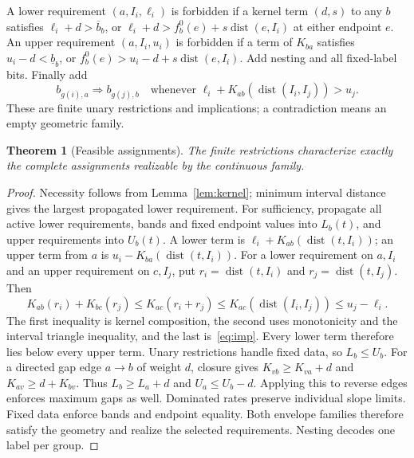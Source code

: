 \documentclass[10pt,letterpaper]{article}
\newtheorem{theorem}[proposition]{Theorem}
\newcommand{\dist}{\operatorname{dist}}
\begin{document}
A lower requirement $(a,I_i,\ell_i)$ is forbidden if a kernel term $(d,s)$ to any $b$ satisfies $\ell_i+d>\overline b_b$, or $\ell_i+d>f_b^0(e)+s\dist(e,I_i)$ at either endpoint $e$. An upper requirement $(a,I_i,u_i)$ is forbidden if a term of $K_{ba}$ satisfies $u_i-d<\underline b_b$, or $f_b^0(e)>u_i-d+s\dist(e,I_i)$. Add nesting and all fixed-label bits. Finally add
\begin{equation}
b_{g(i),a}\Rightarrow b_{g(j),b}
\quad\text{whenever }\ell_i+K_{ab}(\dist(I_i,I_j))>u_j.\label{eq:imp}
\end{equation}
These are finite unary restrictions and implications; a contradiction means an empty geometric family.

\begin{samepage}
\begin{theorem}[Feasible assignments]\label{thm:feas}
The finite restrictions characterize exactly the complete assignments realizable by the continuous family.
\end{theorem}
\end{samepage}
\begin{proof}
Necessity follows from Lemma~\ref{lem:kernel}; minimum interval distance gives the largest propagated lower requirement. For sufficiency, propagate all active lower requirements, bands and fixed endpoint values into $L_b(t)$, and upper requirements into $U_b(t)$. A lower term is $\ell_i+K_{ab}(\dist(t,I_i))$; an upper term from $a$ is $u_i-K_{ba}(\dist(t,I_i))$. For a lower requirement on $a,I_i$ and an upper requirement on $c,I_j$, put $r_i=\dist(t,I_i)$ and $r_j=\dist(t,I_j)$. Then
\[
K_{ab}(r_i)+K_{bc}(r_j)\le K_{ac}(r_i+r_j)
\le K_{ac}(\dist(I_i,I_j))\le u_j-\ell_i.
\]
The first inequality is kernel composition, the second uses monotonicity and the interval triangle inequality, and the last is~\eqref{eq:imp}. Every lower term therefore lies below every upper term. Unary restrictions handle fixed data, so $L_b\le U_b$.
For a directed gap edge $a\to b$ of weight $d$, closure gives $K_{vb}\ge K_{va}+d$ and $K_{av}\ge d+K_{bv}$. Thus $L_b\ge L_a+d$ and $U_a\le U_b-d$. Applying this to reverse edges enforces maximum gaps as well. Dominated rates preserve individual slope limits. Fixed data enforce bands and endpoint equality. Both envelope families therefore satisfy the geometry and realize the selected requirements. Nesting decodes one label per group.
\end{proof}

\FloatBarrier
\end{document}
